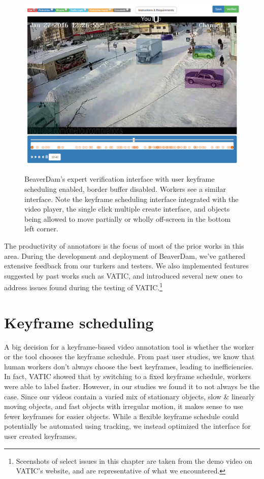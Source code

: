 \begin{figure}[h]
\includegraphics[width=15cm]{figs/interface.png}
\label{interface}
\centering
\caption{BeaverDam's expert verification interface with user keyframe scheduling enabled, border buffer disabled. Workers see a similar interface. Note the keyframe scheduling interface integrated with the video player, the single click multiple create interface, and objects being allowed to move partially or wholly off-screen in the bottom left corner.}
\end{figure}

The productivity of annotators is the focus of most of the prior works in this area.
During the development and deployment of BeaverDam, we've gathered extensive feedback from our turkers and testers.
We also implemented features suggested by past works such as VATIC,
and introduced several new ones to address issues found during the testing of VATIC.\footnote{Sceenshots of select issues in this chapter are taken from the demo video on VATIC's website, and are representative of what we encountered.}


\section{Keyframe scheduling}

A big decision for a keyframe-based video annotation tool is whether the worker or the tool chooses the keyframe schedule.
From past user studies, we know that human workers don't always choose the best keyframes, leading to inefficiencies.
In fact, VATIC showed that by switching to a fixed keyframe schedule, workers were able to label faster.
However, in our studies we found it to not always be the case.
Since our videos contain a varied mix of stationary objects, slow \& linearly moving objects, and fast objects with irregular motion, it makes sense to use fewer keyframes for easier objects.
While a flexible keyframe schedule could potentially be automated using tracking, we instead optimized the interface for user created keyframes.

